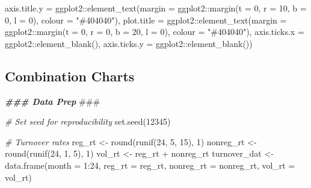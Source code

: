 \documentclass[
]{book}
\newenvironment{Shaded}{\begin{snugshade}}{\end{snugshade}}
\newcommand{\AlertTok}[1]{\textcolor[rgb]{0.94,0.16,0.16}{#1}}
\newcommand{\AttributeTok}[1]{\textcolor[rgb]{0.77,0.63,0.00}{#1}}
\newcommand{\CommentTok}[1]{\textcolor[rgb]{0.56,0.35,0.01}{\textit{#1}}}
\newcommand{\DecValTok}[1]{\textcolor[rgb]{0.00,0.00,0.81}{#1}}
\newcommand{\DocumentationTok}[1]{\textcolor[rgb]{0.56,0.35,0.01}{\textbf{\textit{#1}}}}
\newcommand{\FunctionTok}[1]{\textcolor[rgb]{0.00,0.00,0.00}{#1}}
\newcommand{\NormalTok}[1]{#1}
\newcommand{\OtherTok}[1]{\textcolor[rgb]{0.56,0.35,0.01}{#1}}
\newcommand{\SpecialCharTok}[1]{\textcolor[rgb]{0.00,0.00,0.00}{#1}}
\newcommand{\StringTok}[1]{\textcolor[rgb]{0.31,0.60,0.02}{#1}}
\begin{document}
\begin{Shaded}
\begin{Highlighting}[]
               \AttributeTok{axis.title.y =}\NormalTok{ ggplot2}\SpecialCharTok{::}\FunctionTok{element\_text}\NormalTok{(}\AttributeTok{margin =}\NormalTok{ ggplot2}\SpecialCharTok{::}\FunctionTok{margin}\NormalTok{(}\AttributeTok{t =} \DecValTok{0}\NormalTok{, }\AttributeTok{r =} \DecValTok{10}\NormalTok{, }\AttributeTok{b =} \DecValTok{0}\NormalTok{, }\AttributeTok{l =} \DecValTok{0}\NormalTok{), }\AttributeTok{colour =} \StringTok{"\#404040"}\NormalTok{),}
               \AttributeTok{plot.title =}\NormalTok{ ggplot2}\SpecialCharTok{::}\FunctionTok{element\_text}\NormalTok{(}\AttributeTok{margin =}\NormalTok{ ggplot2}\SpecialCharTok{::}\FunctionTok{margin}\NormalTok{(}\AttributeTok{t =} \DecValTok{0}\NormalTok{, }\AttributeTok{r =} \DecValTok{0}\NormalTok{, }\AttributeTok{b =} \DecValTok{20}\NormalTok{, }\AttributeTok{l =} \DecValTok{0}\NormalTok{), }\AttributeTok{colour =} \StringTok{"\#404040"}\NormalTok{),}
               \AttributeTok{axis.ticks.x =}\NormalTok{ ggplot2}\SpecialCharTok{::}\FunctionTok{element\_blank}\NormalTok{(),}
               \AttributeTok{axis.ticks.y =}\NormalTok{ ggplot2}\SpecialCharTok{::}\FunctionTok{element\_blank}\NormalTok{())}
\end{Highlighting}
\end{Shaded}

\hypertarget{combination-charts-1}{%
\subsection{Combination Charts}\label{combination-charts-1}}

\begin{Shaded}
\begin{Highlighting}[]
\DocumentationTok{\#\#\# Data Prep }\AlertTok{\#\#\#}

\CommentTok{\# Set seed for reproducibility}
\FunctionTok{set.seed}\NormalTok{(}\DecValTok{12345}\NormalTok{)}

\CommentTok{\# Turnover rates}
\NormalTok{reg\_rt }\OtherTok{\textless{}{-}} \FunctionTok{round}\NormalTok{(}\FunctionTok{runif}\NormalTok{(}\DecValTok{24}\NormalTok{, }\DecValTok{5}\NormalTok{, }\DecValTok{15}\NormalTok{), }\DecValTok{1}\NormalTok{)}
\NormalTok{nonreg\_rt }\OtherTok{\textless{}{-}} \FunctionTok{round}\NormalTok{(}\FunctionTok{runif}\NormalTok{(}\DecValTok{24}\NormalTok{, }\DecValTok{1}\NormalTok{, }\DecValTok{5}\NormalTok{), }\DecValTok{1}\NormalTok{)}
\NormalTok{vol\_rt }\OtherTok{\textless{}{-}}\NormalTok{ reg\_rt }\SpecialCharTok{+}\NormalTok{ nonreg\_rt}
\NormalTok{turnover\_dat }\OtherTok{\textless{}{-}} \FunctionTok{data.frame}\NormalTok{(}\AttributeTok{month =} \DecValTok{1}\SpecialCharTok{:}\DecValTok{24}\NormalTok{,}
                           \AttributeTok{reg\_rt =}\NormalTok{ reg\_rt,}
                           \AttributeTok{nonreg\_rt =}\NormalTok{ nonreg\_rt,}
                           \AttributeTok{vol\_rt =}\NormalTok{ vol\_rt)}
\end{Highlighting}
\end{Shaded}
\end{document}
